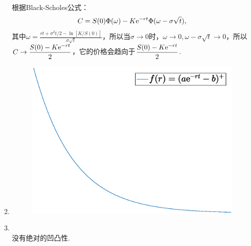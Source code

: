 \begin{enumerate}[label=\arabic{section}.\arabic*]
    根据Black-Scholes公式：
    \[C=S(0)\Phi(\omega)-K\mathrm{e}^{-rt}\Phi(\omega-\sigma\sqrt{t}),\]
    其中$\displaystyle \omega=\frac{rt+\sigma^2t/2-\ln[K/S(0)]}{\sigma\sqrt{t}}$，所以当$\sigma \to 0$时，$\omega \to 0, \omega-\sigma\sqrt{t} \to 0$，所以$\displaystyle C \to \frac{S(0)-K\mathrm{e}^{-rt}}{2}$，它的价格会趋向于$\displaystyle \frac{S(0)-K\mathrm{e}^{-rt}}{2}$.
    \item \sol
    \begin{figure}[H]
        \centering
        \includegraphics[scale=0.4]{7.17.eps}
    \end{figure}
    \item \sol\\
    没有绝对的凹凸性.
\end{enumerate}
\clearpage